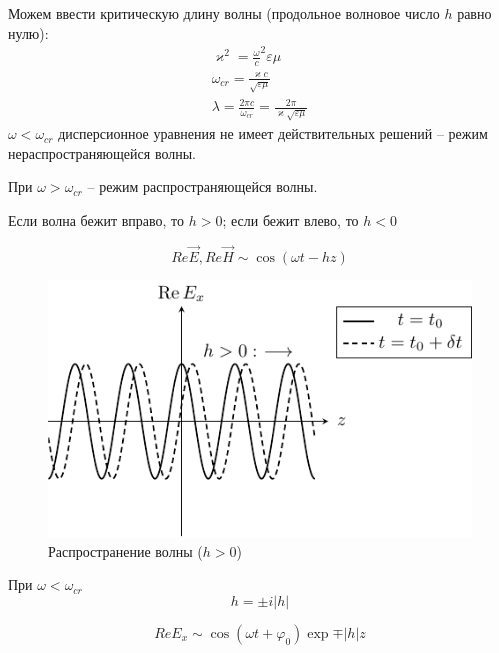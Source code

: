 \documentclass[a4paper,14pt]{extarticle}
\renewcommand{\phi}{\varphi}
\renewcommand{\epsilon}{\varepsilon}
\renewcommand{\kappa}{\varkappa}
\begin{document}
Можем ввести критическую длину волны (продольное волновое число $h$ равно нулю):
\begin{gather*}
\kappa^2 = {\frac{\omega}{c}}^2 {\epsilon \mu}\\
\omega_{cr} = \frac{\kappa c}{\sqrt{\epsilon \mu}}\\
\lambda = \frac{2 \pi c}{\omega_{cr}} = \frac{2 \pi}{\kappa \sqrt{\epsilon \mu}}
\end{gather*}
$\omega < \omega_{cr}$ дисперсионное уравнения не имеет действительных решений -- режим нераспространяющейся волны. 

При  $\omega > \omega_{cr}$ -- режим распространяющейся волны.

Если волна бежит вправо, то $h > 0$; если бежит влево, то $h < 0$

\begin{equation*}
Re{\vec{E}} , Re{\vec{H}} \sim \cos(\omega t - h z)
\end{equation*}

\begin{figure}[h!]
	\centering
	\includegraphics[scale=1]{img/lect3_ris1}
	\caption{Распространение волны ($h>0$)}
	\label{fig:lect3:1}
\end{figure}
При $\omega < \omega_{cr}$
\begin{equation*}
h = \pm i |h|
\end{equation*}

\begin{equation*}
Re{E_x} \sim \cos(\omega t + \phi_0) \exp{\mp |h| z}
\end{equation*}
\end{document}
